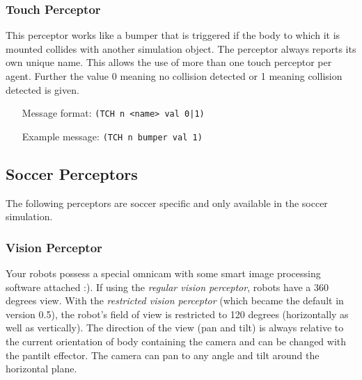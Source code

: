 \subsubsection{Touch Perceptor}
\label{sec:touchperceptor}
This perceptor works like a bumper that is triggered if the body
to which it is mounted collides with another simulation object. The
perceptor always reports its own unique name. This allows the use of
more than one touch perceptor per agent. Further the value 0 meaning no
collision detected or 1 meaning collision detected is given.

\begin{itemize}
	\item[Message format:] \texttt{(TCH n <name> val 0|1)}
	\item[Example message:] \texttt{(TCH n bumper val 1)}
\end{itemize}





\subsection{Soccer Perceptors}
\label{sec:soccerperceptors}
The following perceptors are soccer specific and only available in the soccer
simulation.



\subsubsection{Vision Perceptor}
\label{sec:visionperceptor}
Your robots possess a special omnicam with some smart image processing software
attached :). If using the \emph{regular vision perceptor}, robots have a 360
degrees view. With the \emph{restricted vision perceptor} (which became the
default in version 0.5), the robot's field of view is restricted to 120 degrees
(horizontally as well as vertically). The direction of the view (pan and tilt)
is always relative to the current orientation of body containing the camera and
can be changed with the pantilt effector. The camera can pan to any angle and
tilt around the horizontal plane.

